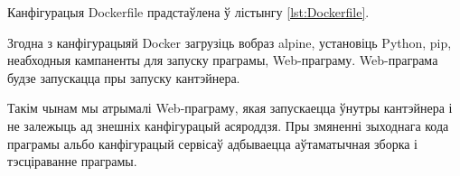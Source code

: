 Канфігурацыя Dockerfile прадстаўлена ў лістынгу \ref{lst:Dockerfile}.



Згодна з канфігурацыяй Docker загрузіць вобраз alpine,
установіць Python, pip, неабходныя кампаненты для запуску праграмы,
Web-праграму.
Web-праграма будзе запускацца пры запуску кантэйнера.

Такім чынам мы атрымалі Web-праграму, якая запускаецца ўнутры кантэйнера
і не залежыць ад знешніх канфігурацый асяроддзя.
Пры змяненні зыходнага кода праграмы альбо канфігурацый сервісаў
адбываецца аўтаматычная зборка і тэсціраванне праграмы.
